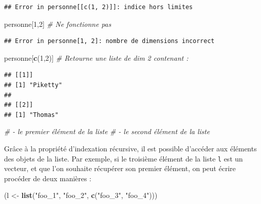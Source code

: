 \documentclass[
  11pt,
]{book}
\newenvironment{Shaded}{\begin{snugshade}}{\end{snugshade}}
\newcommand{\CommentTok}[1]{\textcolor[rgb]{0.56,0.35,0.01}{\textit{#1}}}
\newcommand{\DecValTok}[1]{\textcolor[rgb]{0.00,0.00,0.81}{#1}}
\newcommand{\KeywordTok}[1]{\textcolor[rgb]{0.13,0.29,0.53}{\textbf{#1}}}
\newcommand{\NormalTok}[1]{#1}
\newcommand{\StringTok}[1]{\textcolor[rgb]{0.31,0.60,0.02}{#1}}
\numberwithin{equation}{section}
\numberwithin{countremarque}{section}
\begin{document}
\begin{lstlisting}
## Error in personne[[c(1, 2)]]: indice hors limites
\end{lstlisting}

\begin{Shaded}
\begin{Highlighting}[]
\NormalTok{personne[}\DecValTok{1}\NormalTok{,}\DecValTok{2}\NormalTok{] }\CommentTok{\# Ne fonctionne pas}
\end{Highlighting}
\end{Shaded}

\begin{lstlisting}
## Error in personne[1, 2]: nombre de dimensions incorrect
\end{lstlisting}

\begin{Shaded}
\begin{Highlighting}[]
\NormalTok{personne[}\KeywordTok{c}\NormalTok{(}\DecValTok{1}\NormalTok{,}\DecValTok{2}\NormalTok{)]    }\CommentTok{\# Retourne une liste de dim 2 contenant :}
\end{Highlighting}
\end{Shaded}

\begin{lstlisting}
## [[1]]
## [1] "Piketty"
## 
## [[2]]
## [1] "Thomas"
\end{lstlisting}

\begin{Shaded}
\begin{Highlighting}[]
    \CommentTok{\# {-} le premier élément de la liste}
    \CommentTok{\# {-} le second élément de la liste}
\end{Highlighting}
\end{Shaded}

Grâce à la propriété d'indexation récursive, il est possible d'accéder aux éléments des objets de la liste. Par exemple, si le troisième élément de la liste \texttt{l} est un vecteur, et que l'on souhaite récupérer son premier élément, on peut écrire procéder de deux manières :

\begin{Shaded}
\begin{Highlighting}[]
\NormalTok{(l \textless{}{-}}\StringTok{ }\KeywordTok{list}\NormalTok{(}\StringTok{"foo\_1"}\NormalTok{, }\StringTok{"foo\_2"}\NormalTok{, }\KeywordTok{c}\NormalTok{(}\StringTok{"foo\_3"}\NormalTok{, }\StringTok{"foo\_4"}\NormalTok{)))}
\end{Highlighting}
\end{Shaded}
\end{document}
